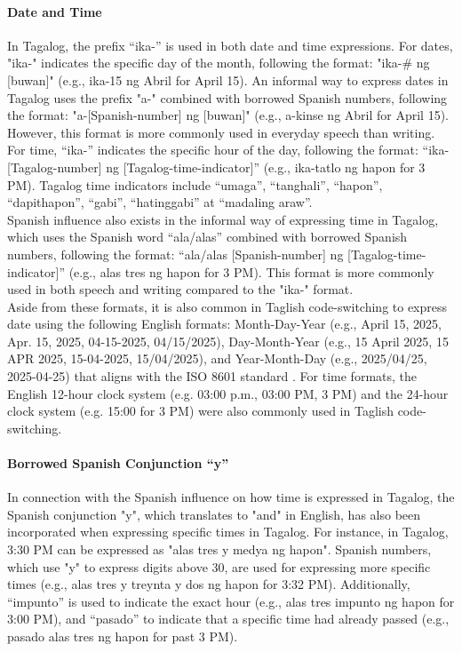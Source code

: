 \documentclass[journal]{./IEEE/IEEEtran}
\begin{document}
\paragraph{Date and Time}

In Tagalog, the prefix “ika-” is used in both date and time expressions. For dates, "ika-" indicates the specific day of the month, following the format: "ika-\# ng [buwan]" (e.g., ika-15 ng Abril for April 15). An informal way to express dates in Tagalog uses the prefix "a-" combined with borrowed Spanish numbers, following the format: "a-[Spanish-number] ng [buwan]" (e.g., a-kinse ng Abril for April 15). However, this format is more commonly used in everyday speech than writing. For time, “ika-” indicates the specific hour of the day, following the format: “ika-[Tagalog-number] ng [Tagalog-time-indicator]” (e.g., ika-tatlo ng hapon for 3 PM). Tagalog time indicators include  “umaga”, “tanghali”, “hapon”, “dapithapon”, “gabi”, “hatinggabi” at “madaling araw”. \\ 

Spanish influence also exists in the informal way of expressing time in Tagalog, which uses the Spanish word “ala/alas” combined with borrowed Spanish numbers, following the format: “ala/alas [Spanish-number] ng [Tagalog-time-indicator]” (e.g., alas tres ng hapon for 3 PM). This format is more commonly used in both speech and writing compared to the "ika-" format. \\

Aside from these formats, it is also common in Taglish code-switching to express date using the following English formats: Month-Day-Year (e.g., April 15, 2025, Apr. 15, 2025, 04-15-2025, 04/15/2025), Day-Month-Year (e.g., 15 April 2025, 15 APR 2025, 15-04-2025, 15/04/2025), and Year-Month-Day (e.g., 2025/04/25, 2025-04-25) that aligns with the ISO 8601 standard {\cite{ISO8601}}. For time formats, the English 12-hour clock system (e.g. 03:00 p.m., 03:00 PM, 3 PM) and the 24-hour clock system (e.g. 15:00 for 3 PM) were also commonly used in Taglish code-switching. \\

\paragraph{Borrowed Spanish Conjunction “y”}

In connection with the Spanish influence on how time is expressed in Tagalog, the Spanish conjunction "y", which translates to "and" in English, has also been incorporated when expressing specific times in Tagalog. For instance, in Tagalog, 3:30 PM can be expressed as "alas tres y medya ng hapon". Spanish numbers, which use "y" to express digits above 30, are used for expressing more specific times (e.g., alas tres y treynta y dos ng hapon for 3:32 PM). Additionally, “impunto” is used to indicate the exact hour (e.g., alas tres impunto ng hapon for 3:00 PM), and “pasado” to indicate that a specific time had already passed (e.g., pasado alas tres ng hapon for past 3 PM). \\
\end{document}
